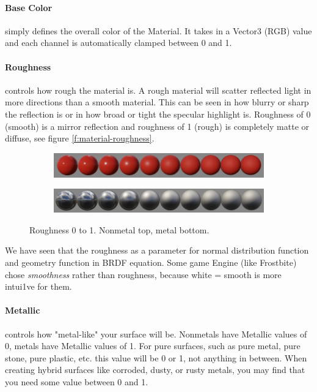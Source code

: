 \paragraph{\textbf{Base Color}} simply defines the overall color of the Material. It takes in a Vector3 (RGB) value and each channel is automatically clamped between 0 and 1.

\paragraph{\textbf{Roughness}} controls how rough the material is. A rough material will scatter reflected light in more directions than a smooth material. This can be seen in how blurry or sharp the reflection is or in how broad or tight the specular highlight is. Roughness of 0 (smooth) is a mirror reflection and roughness of 1 (rough) is completely matte or diffuse, see figure \ref{f:material-roughness}.

\begin{figure}\label{f:material-roughness}
\begin{center}
	\begin{subfigure}[b]{1.\textwidth}
		\includegraphics[width=1.\textwidth]{graphics/gi/roughness_nonmetal}
	\end{subfigure}
	\begin{subfigure}[b]{1.\textwidth}
		\includegraphics[width=1.\textwidth]{graphics/gi/roughness_metal}
	\end{subfigure}
\end{center}
\caption{Roughness 0 to 1. Nonmetal top, metal bottom.}
\end{figure}

We have seen that the roughness as a parameter for normal distribution function and geometry function in BRDF equation. Some game Engine (like Frostbite\cite{a:MovingFrostbitetoPBR}) chose \textit{smoothness} rather than roughness, because white = smooth is more intui1ve for them. 


\paragraph{\textbf{Metallic}} controls how "metal-like" your surface will be. Nonmetals have Metallic values of 0, metals have Metallic values of 1. For pure surfaces, such as pure metal, pure stone, pure plastic, etc. this value will be 0 or 1, not anything in between. When creating hybrid surfaces like corroded, dusty, or rusty metals, you may find that you need some value between 0 and 1.

